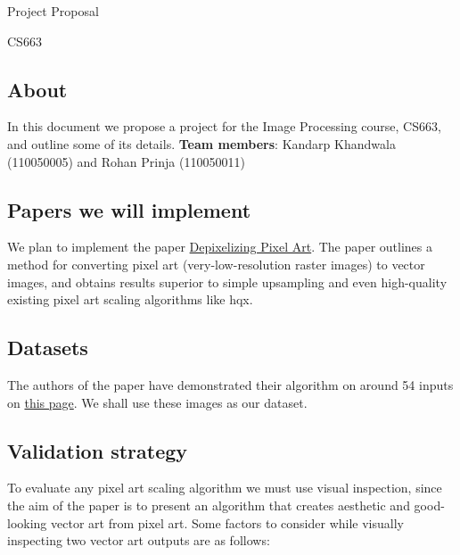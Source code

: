 \documentclass[a4paper,9pt]{article}
\begin{document}


\textcolor{myrust}{\Huge{\centerline{Project Proposal}}}
\textcolor{myrust}{\Large{\centerline{CS663}}}

\textcolor{myrust}{\section{About}}

In this document we propose a project for the Image Processing course, CS663, and outline some of its details. \textbf{Team members}: Kandarp Khandwala (110050005) and Rohan Prinja (110050011)

\textcolor{myrust}{\section{Papers we will implement}}

We plan to implement the paper \href{http://research.microsoft.com/en-us/um/people/kopf/pixelart/}{Depixelizing Pixel Art}. The paper outlines a method for converting pixel art (very-low-resolution raster images) to vector images, and obtains results superior to simple upsampling and even high-quality existing pixel art scaling algorithms like hqx.

\textcolor{myrust}{\section{Datasets}}

The authors of the paper have demonstrated their algorithm on around 54 inputs on \href{http://research.microsoft.com/en-us/um/people/kopf/pixelart/supplementary/comparison\_bicubic.html}{this page}. We shall use these images as our dataset.

\textcolor{myrust}{\section{Validation strategy}}

To evaluate any pixel art scaling algorithm we must use visual inspection, since the aim of the paper is to present an algorithm that creates aesthetic and good-looking vector art from pixel art. Some factors to consider while visually inspecting two vector art outputs are as follows:\\
\end{document}
